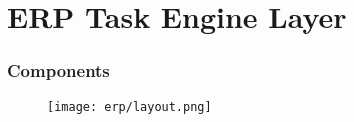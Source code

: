 \section{ERP Task Engine Layer}


\begin{frame}
    \frametitle{Components}
    \begin{figure}
        \centering
        \texttt{[image: erp/layout.png]} %
        \caption{}
    \end{figure}
\end{frame}






